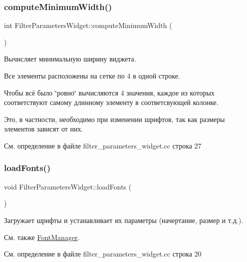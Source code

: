 \subsubsection{\texorpdfstring{compute\+Minimum\+Width()}{computeMinimumWidth()}}
{\footnotesize\ttfamily int Filter\+Parameters\+Widget\+::compute\+Minimum\+Width (\begin{DoxyParamCaption}{ }\end{DoxyParamCaption})\hspace{0.3cm}{\ttfamily [private]}}



Вычисляет минимальную ширину виджета. 

Все элементы расположены на сетке по 4 в одной строке.

Чтобы всё было \char`\"{}ровно\char`\"{} вычисляются 4 значения, каждое из которых соответствуют самому длинному элементу в соответсвующей колонке.

Это, в частности, необходимо при изменении шрифтов, так как размеры элементов зависят от них. 

См. определение в файле filter\+\_\+parameters\+\_\+widget.\+cc строка 27

\hypertarget{class_filter_parameters_widget_aeadea883731fe8ef61b3577319578e02}{}\label{class_filter_parameters_widget_aeadea883731fe8ef61b3577319578e02} 
\subsubsection{\texorpdfstring{load\+Fonts()}{loadFonts()}}
{\footnotesize\ttfamily void Filter\+Parameters\+Widget\+::load\+Fonts (\begin{DoxyParamCaption}{ }\end{DoxyParamCaption})\hspace{0.3cm}{\ttfamily [private]}}



Загружает шрифты и устанавливает их параметры (начертание, размер и т.\+д.). 

\begin{DoxySeeAlso}{См. также}
\hyperlink{class_font_manager}{Font\+Manager}. 
\end{DoxySeeAlso}


См. определение в файле filter\+\_\+parameters\+\_\+widget.\+cc строка 20

